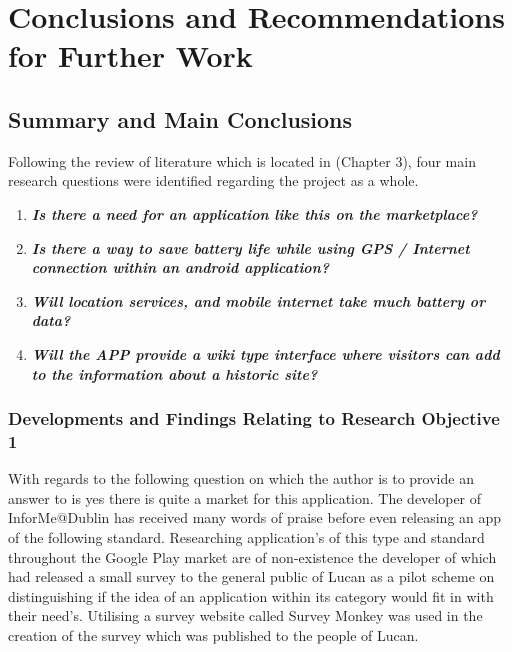 \chapter{Conclusions and Recommendations for Further Work}

\section{Summary and Main Conclusions}

Following the review of literature which is located in (Chapter 3), four main research questions were identified regarding the project as a whole.

\begin{enumerate}
    \item\textbf{\textit{Is there a need for an application like this on the marketplace?}}
    
    \item\textbf{\textit{Is there a way to save battery life while using GPS / Internet connection within an android application?}}
    
    \item\textbf{\textit{Will location services, and mobile internet take much battery or data?}} 
    
    \item\textbf{\textit{Will the APP provide a wiki type interface where visitors can add to the information about a historic site?}}
    
\end{enumerate}  

\subsection{Developments and Findings Relating to Research Objective 1}  
With regards to the following question on which the author is to provide an answer to is yes there is quite a market for this application. The developer of InforMe@Dublin has received many words of praise before even releasing an app of the following standard. Researching application's of this type and standard throughout the Google Play market are of non-existence the developer of which had released a small survey to the general public of Lucan as a pilot scheme on distinguishing if the idea of an application within its category would fit in with their need's. Utilising a survey website called Survey Monkey was used in the creation of the survey which was published to the people of Lucan.

